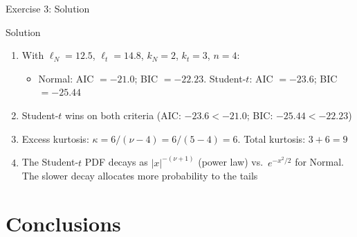 \documentclass[9pt, aspectratio=169, t]{beamer}
\theoremstyle{definition}
\begin{document}
\begin{frame}{Exercise 3: Solution}
\begin{block}{Solution}
\begin{enumerate}
\item With $\ell_N = 12.5$, $\ell_t = 14.8$, $k_N = 2$, $k_t = 3$, $n = 4$:
\begin{itemize}
\item Normal: AIC $= -21.0$; BIC $= -22.23$. \; Student-$t$: AIC $= -23.6$; BIC $= -25.44$
\end{itemize}
\item Student-$t$ wins on both criteria (AIC: $-23.6 < -21.0$; BIC: $-25.44 < -22.23$)
\item Excess kurtosis: $\kappa = 6/(\nu - 4) = 6/(5-4) = 6$. Total kurtosis: $3 + 6 = 9$
\item The Student-$t$ PDF decays as $|x|^{-(\nu+1)}$ (power law) vs.\ $e^{-x^2/2}$ for Normal. The slower decay allocates more probability to the tails
\end{enumerate}
\end{block}
\end{frame}

\section{Conclusions}
\end{document}
